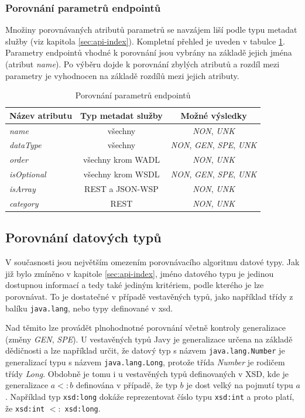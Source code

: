 \documentclass[czech,DP]{thesiskiv}
\begin{document}
\subsubsection{Porovnání parametrů endpointů}

Množiny porovnávaných atributů parametrů se navzájem liší podle typu metadat služby (viz kapitola \ref{sec:api-index}). Kompletní přehled je uveden v tabulce \ref{tab:param-cmp}. Parametry endpointů vhodné k porovnání jsou vybrány na základě jejich jména (atribut \textit{name}). Po výběru dojde k porovnání zbylých atributů a rozdíl mezi parametry je vyhodnocen na základě rozdílů mezi jejich atributy.

\begin{table}[h]
	\centering
	\begin{tabular}{|l|c|c|}
		\hline
		Název atributu & Typ metadat služby & Možné výsledky \\
		\hline
		\hline
		\textit{name} & všechny & \textit{NON}, \textit{UNK} \\
		\hline 
		\textit{dataType} & všechny & \textit{NON}, \textit{GEN}, \textit{SPE}, \textit{UNK} \\
		\hline
		\textit{order} & všechny krom WADL & \textit{NON}, \textit{UNK} \\
		\hline
		\textit{isOptional} & všechny krom WSDL & \textit{NON}, \textit{GEN}, \textit{SPE}, \textit{UNK} \\
		\hline
		\textit{isArray} & REST a JSON-WSP & \textit{NON}, \textit{UNK} \\
		\hline
		\textit{category} & REST & \textit{NON}, \textit{UNK} \\
		\hline
	\end{tabular}
	\caption{Porovnání parametrů endpointů }
	\label{tab:param-cmp}
\end{table}


\subsection{Porovnání datových typů}
\label{sec:type-cmp}
V současnosti jsou největším omezením porovnávacího algoritmu datové typy. Jak již bylo zmíněno v kapitole \ref{sec:api-index}, jméno datového typu je jedinou dostupnou informací a tedy také jediným kritériem, podle kterého je lze porovnávat. To je dostatečné v případě vestavěných typů, jako například třídy z balíku \verb|java.lang|, nebo typy definované v xsd. 

Nad těmito lze provádět plnohodnotné porovnání včetně kontroly generalizace (změny \textit{GEN}, \textit{SPE}). U vestavěných typů Javy je generalizace určena na základě dědičnosti a lze například určit, že datový typ s názvem \verb|java.lang.Number| je generalizací typu s názvem \verb|java.lang.Long|, protože třída \textit{Number} je rodičem třídy \textit{Long}. Obdobně je tomu i u vestavěných typů definovaných v XSD, kde je generalizace $a <: b$ definována v případě, že typ $b$ je dost velký na pojmutí typu $a$. Například typ \verb|xsd:long| dokáže reprezentovat číslo typu \verb|xsd:int| a proto platí, že \verb|xsd:int| $<:$ \verb|xsd:long|. 
\end{document}
